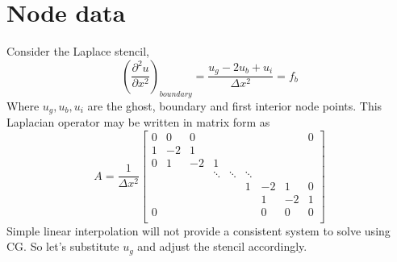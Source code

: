 \documentclass[landscape]{article}
\begin{document}
\section{Node data}
Consider the Laplace stencil,
\begin{equation}
   \left(\frac{\partial^2 u}{\partial x^2}\right)_{boundary} =
   \frac{u_g - 2 u_b + u_i}{\Delta x^2} = f_b
\end{equation}
Where $u_g,u_b,u_i$ are the ghost, boundary and first interior node points. This Laplacian operator may be written in matrix form as
\[ A = \frac{1}{\Delta x^2} \left[\begin{array}{ccccccccc}
0  & 0     & 0         &           &           &           &           &         &  0 \\
1  & -2    & 1         &           &           &           &           &         &    \\
0  & 1     & -2        & 1         &           &           &           &         &    \\
   &       &           & \ddots    & \ddots    & \ddots    &           &         &    \\
   &       &           &           &           & 1         & -2        & 1       &  0 \\
   &       &           &           &           &           &  1        & -2      &  1 \\
0  &       &           &           &           &           &  0        & 0       &  0 \\
\end{array} \right]
\]
Simple linear interpolation will not provide a consistent system to solve using CG. So let's substitute $u_g$ and adjust the stencil accordingly.
\end{document}
